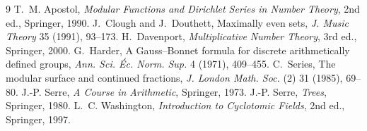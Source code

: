 \documentclass[11pt]{article}
\begin{document}
\begin{thebibliography}{9}
 T.~M. Apostol, \emph{Modular Functions and Dirichlet Series in Number Theory}, 2nd ed., Springer, 1990.
 J.~Clough and J.~Douthett, Maximally even sets, \emph{J. Music Theory} 35 (1991), 93--173.
 H.~Davenport, \emph{Multiplicative Number Theory}, 3rd ed., Springer, 2000.
 G.~Harder, A Gauss--Bonnet formula for discrete arithmetically defined groups, \emph{Ann. Sci. \'Ec. Norm. Sup.} 4 (1971), 409--455.
 C.~Series, The modular surface and continued fractions, \emph{J. London Math. Soc.} (2) 31 (1985), 69--80.
 J.-P. Serre, \emph{A Course in Arithmetic}, Springer, 1973.
 J.-P. Serre, \emph{Trees}, Springer, 1980.
 L.~C. Washington, \emph{Introduction to Cyclotomic Fields}, 2nd ed., Springer, 1997.
\end{thebibliography}
\end{document}
